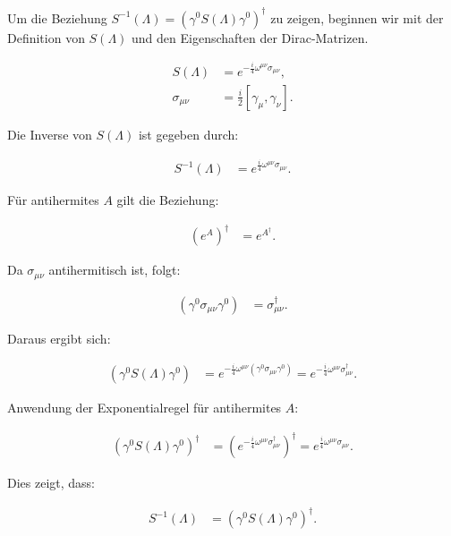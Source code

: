 Um die Beziehung \( S^{-1}(\Lambda) = \left(\gamma^0 S(\Lambda) \gamma^0\right)^{\dagger} \) zu zeigen, beginnen wir mit der Definition von \( S(\Lambda) \) und den Eigenschaften der Dirac-Matrizen.

\begin{align*}
S(\Lambda) &= e^{-\frac{i}{4} \omega^{\mu \nu} \sigma_{\mu \nu}}, \\
\sigma_{\mu \nu} &= \frac{i}{2} [\gamma_\mu, \gamma_\nu].
\end{align*}

Die Inverse von \( S(\Lambda) \) ist gegeben durch:

\begin{align*}
S^{-1}(\Lambda) &= e^{\frac{i}{4} \omega^{\mu \nu} \sigma_{\mu \nu}}.
\end{align*}

Für antihermites \( A \) gilt die Beziehung:

\begin{align*}
(e^A)^{\dagger} &= e^{A^{\dagger}}.
\end{align*}

Da \( \sigma_{\mu \nu} \) antihermitisch ist, folgt:

\begin{align*}
(\gamma^0 \sigma_{\mu \nu} \gamma^0) &= \sigma_{\mu \nu}^\dagger.
\end{align*}

Daraus ergibt sich:

\begin{align*}
\left(\gamma^0 S(\Lambda) \gamma^0\right) &= e^{-\frac{i}{4} \omega^{\mu \nu} (\gamma^0 \sigma_{\mu \nu} \gamma^0)} = e^{-\frac{i}{4} \omega^{\mu \nu} \sigma_{\mu \nu}^\dagger}.
\end{align*}

Anwendung der Exponentialregel für antihermites \( A \):

\begin{align*}
\left(\gamma^0 S(\Lambda) \gamma^0\right)^{\dagger} &= \left(e^{-\frac{i}{4} \omega^{\mu \nu} \sigma_{\mu \nu}^\dagger}\right)^{\dagger} = e^{\frac{i}{4} \omega^{\mu \nu} \sigma_{\mu \nu}}.
\end{align*}

Dies zeigt, dass:

\begin{align*}
S^{-1}(\Lambda) &= \left(\gamma^0 S(\Lambda) \gamma^0\right)^{\dagger}.
\end{align*}

